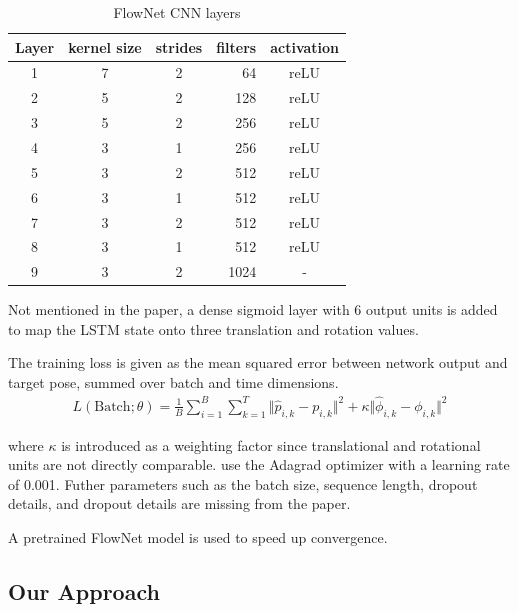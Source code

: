\documentclass[a4paper,11pt]{article}
\begin{document}
\begin{table}
    \centering
    \caption{FlowNet CNN layers}
    \label{tab:cnn}
    \begin{tabular}{cccrc}
        Layer & kernel size & strides & filters & activation\\\hline
        1     & 7           & 2       & 64      & reLU\\
        2     & 5           & 2       & 128     & reLU\\
        3     & 5           & 2       & 256     & reLU\\
        4     & 3           & 1       & 256     & reLU\\
        5     & 3           & 2       & 512     & reLU\\
        6     & 3           & 1       & 512     & reLU\\
        7     & 3           & 2       & 512     & reLU\\
        8     & 3           & 1       & 512     & reLU\\
        9     & 3           & 2       & 1024    & -\\\hline
    \end{tabular}
\end{table}

Not mentioned in the paper, a dense sigmoid layer with 6 output units is added
to map the LSTM state onto three translation and rotation values.

The training loss is given as the mean squared error between network output and
target pose, summed over batch and time dimensions.
\begin{align}
    L(\text{Batch}; \theta) = \frac{1}{B} \sum^{B}_{i=1} \sum^{T}_{k=1}
    \Vert\hat{p}_{i,k} - p_{i,k} \Vert^2 + \kappa \Vert \hat{\phi}_{i,k} - \phi_{i,k} \Vert^2
\end{align}

where $\kappa$ is introduced as a weighting factor since translational and
rotational units are not directly comparable. \cite{wang2017deepvo} use the
Adagrad optimizer with a learning rate of 0.001. Futher parameters such as the
batch size, sequence length, dropout details, and dropout details are
missing from the paper.

A pretrained FlowNet model is used to speed up convergence.

\subsection{Our Approach}
\label{sec:deepvo:approach}
\end{document}
